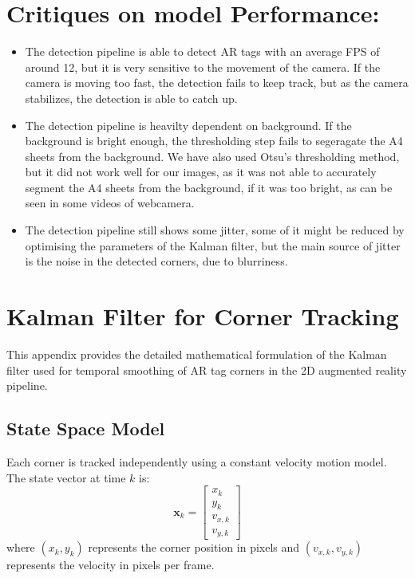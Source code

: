 \documentclass[9pt,a4paper,twocolumn,twoside]{tau-class/tau}
\begin{document}
\section{Critiques on model Performance:}
\begin{itemize}
    \item The detection pipeline is able to detect AR tags with an average FPS of around 12, but it is very sensitive to the movement of the camera. If the camera is moving too fast, the detection fails to keep track, but as the camera stabilizes, the detection is able to catch up.
    \item The detection pipeline is heavilty dependent on background. If the background is bright enough, the thresholding step fails to segeragate the A4 sheets from the background. We have also used Otsu's thresholding method, but it did not work well for our images, as it was not able to accurately segment the A4 sheets from the background, if it was too bright, as can be seen in some videos of webcamera.
    \item The detection pipeline still shows some jitter, some of it might be reduced by optimising the parameters of the Kalman filter, but the main source of jitter is the noise in the detected corners, due to blurriness. 
\end{itemize}


\appendix

\section{Kalman Filter for Corner Tracking}

    This appendix provides the detailed mathematical formulation of the Kalman filter used for temporal smoothing of AR tag corners in the 2D augmented reality pipeline.
    \newline
    \subsection{State Space Model}

    Each corner is tracked independently using a constant velocity motion model. The state vector at time $k$ is:
    \begin{equation}
        \mathbf{x}_k = \begin{bmatrix} x_k \\ y_k \\ v_{x,k} \\ v_{y,k} \end{bmatrix}
    \end{equation}
    where $(x_k, y_k)$ represents the corner position in pixels and $(v_{x,k}, v_{y,k})$ represents the velocity in pixels per frame.
\end{document}
